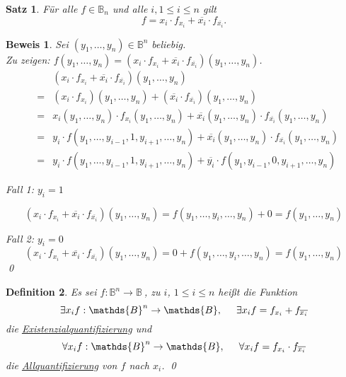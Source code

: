 \documentclass[ngerman]{scrartcl}
\theoremstyle{custom}
\newtheorem{mdef}{Definition} \numberwithin{mdef}{subsection}
\newtheorem{ms}[mdef]{Satz}
\newtheorem*{bw}{Beweis}
\newcommand{\0}{\mathbf{0}}
\newcommand{\1}{\mathbf{L}}
\newcommand{\bol}{\mathds{B}^n \rightarrow \mathds{B}}
\newcommand{\bolf}{$f: \bol~$}
\begin{document}
\begin{ms}
F\"ur alle $f \in \mathds{B}_n$ und alle $i, 1 \leq i \leq n$ gilt
\begin{equation*}
f = x_i \cdot f_{x_i} + \overline{x_i} \cdot f_{\overline{x_i}}.
\end{equation*}
\end{ms}

\begin{bw}
Sei $(y_1, \dots, y_n) \in \mathds{B}^n$ beliebig.\\
Zu zeigen: $f(y_1, \dots, y_n) = (x_i \cdot f_{x_i} + \overline{x_i}
\cdot f_{\overline{x_i}})(y_1, \dots, y_n)$.
\begin{eqnarray*}
&&(x_i \cdot f_{x_i} + \overline{x_i} \cdot f_{\overline{x_i}})(y_1,
\dots, y_n)\\
&=& (x_i \cdot f_{x_i})(y_1, \dots,
y_n)+(\overline{x_i} \cdot f_{\overline{x_i}})(y_1, \dots, y_n)\\
&=& x_i(y_1, \dots, y_n) \cdot f_{x_i}(y_1, \dots, y_n) +
\overline{x_i}(y_1, \dots, y_n) \cdot f_{\overline{x_i}}(y_1, \dots,
y_n)\\
&=& y_i \cdot f(y_1, \dots, y_{i-1}, 1, y_{i+1}, \dots, y_n) +
\overline{x_i}(y_1, \dots, y_n) \cdot f_{\overline{x_i}}(y_1, \dots,
y_n)\\
&=& y_i \cdot f(y_1, \dots, y_{i-1}, 1, y_{i+1}, \dots,y_n) +
\overline{y_i} \cdot f(y_1, y_{i-1}, 0, y_{i+1}, \dots, y_n) 
\end{eqnarray*}

Fall 1: $y_i = 1$

\begin{equation*}
(x_i \cdot f_{x_i} + \overline{x_i} \cdot
f_{\overline{x_i}})(y_1,\dots, y_n) = f(y_1,\dots, y_i, \dots, y_n) +
0 = f(y_1, \dots, y_n)
\end{equation*}

Fall 2: $y_i = 0$
\begin{equation*}
(x_i \cdot f_{x_i} + \overline{x_i} \cdot
f_{\overline{x_i}})(y_1,\dots, y_n) = 0+ f(y_1,\dots, y_i, \dots, y_n) = f(y_1, \dots, y_n)
\end{equation*}
\qed
\end{bw}

\begin{mdef}
Es sei \bolf, zu $i$, $1 \leq i \leq n$ hei\ss t die Funktion 
\begin{equation*}
\exists x_i f: \mathds{B}^n \rightarrow \mathds{B}, \hspace{0.5cm}
\exists x_i f= f_{x_i} + f_{\overline{x_i}}
\end{equation*}
die \underline{Existenzialquantifizierung} und 
\begin{equation*}
\forall x_i f: \mathds{B}^n \rightarrow \mathds{B}, \hspace{0.5cm}
\forall x_i f= f_{x_i} \cdot f_{\overline{x_i}}
\end{equation*}
die \underline{Allquantifizierung} von $f$ nach $x_i$.
\qed
\end{mdef}
\end{document}
